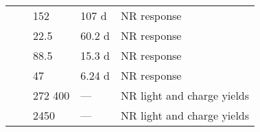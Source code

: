 \begin{table}[h]
\begin{tabularx}{1.0\linewidth}{@{\extracolsep{\fill}}lllll}
    \hline
    
    \YBe{}	    & \gammaN{}     & 152       & 107 d     & NR response \\ 
    \SbBe{}	    & \gammaN{}     & 22.5      & 60.2 d    & NR response \\ 
    \BiBeTZF{}	& \gammaN{}     & 88.5      & 15.3 d    & NR response \\ 
    \BiBeTZS{}	& \gammaN{}     & 47        & 6.24 d    & NR response \\ 
    
    \hline
    
    \DD{}	& \neutron{}        & 272 \xrightarrow{} 400        & ---     & NR light and charge yields \\ 
    \DD{}	& \neutron{}        & 2450                          & ---     & NR light and charge yields \\
    
    \bottomrule
    \end{tabularx}
\end{table}